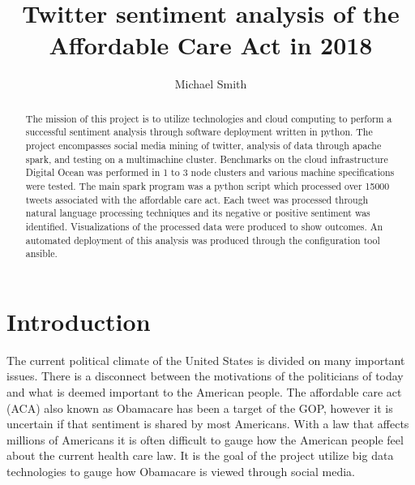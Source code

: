 
\title{Twitter sentiment analysis of the Affordable Care Act in 2018}


\author{Michael Smith}



\renewcommand{\shortauthors}{M. Smith}


\begin{abstract}
The mission of this project is to utilize technologies and cloud
computing to perform a successful sentiment analysis through software
deployment written in python.  The project encompasses social media
mining of twitter, analysis of data through apache spark, and testing
on a multimachine cluster.  Benchmarks on the cloud infrastructure
Digital Ocean was performed in 1 to 3 node clusters and various
machine specifications were tested.  The main spark program was a
python script which processed over 15000 tweets associated with the
affordable care act.  Each tweet was processed through natural
language processing techniques and its negative or positive sentiment
was identified.  Visualizations of the processed data were produced to
show outcomes.  An automated deployment of this analysis was produced
through the configuration tool ansible.

\end{abstract}





\maketitle


\section{Introduction}

The current political climate of the United States is divided on many
important issues.  There is a disconnect between the motivations of
the politicians of today and what is deemed important to the American
people.  The affordable care act (ACA) also known as Obamacare has
been a target of the GOP, however it is uncertain if that sentiment is
shared by most Americans.  With a law that affects millions of
Americans it is often difficult to gauge how the American people feel
about the current health care law.  It is the goal of the project
utilize big data technologies to gauge how Obamacare is viewed through
social media.

